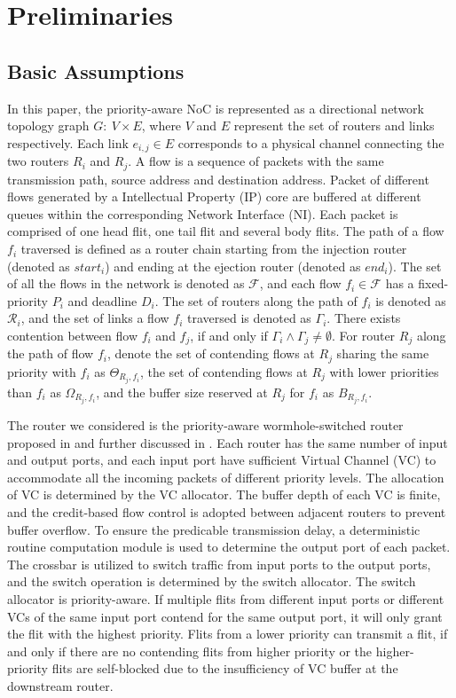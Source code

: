 \documentclass[preprint]{elsarticle}
\begin{document}
\section{Preliminaries}\label{model}
\subsection{Basic Assumptions}
In this paper, the priority-aware NoC is represented as a directional network topology graph $G:\ V\times E$, where $V$ and $E$ represent the set of routers and links respectively. Each link $e_{i,j}\in E$ corresponds to a physical channel connecting the two routers $R_i$ and $R_j$. A flow is a sequence of packets with the same transmission path, source address and destination address. Packet of different flows generated by a Intellectual Property (IP) core are buffered at different queues within the corresponding Network Interface (NI). Each packet is comprised of one head flit, one tail flit and several body flits. The path of a flow $f_i$ traversed is defined as a router chain starting from the injection router (denoted as $start_i$) and ending at the ejection router (denoted as $end_i$). The set of all the flows in the network is denoted as $\mathcal{F}$, and each flow $f_i\in\mathcal{F}$ has a fixed-priority $P_i$ and deadline $D_i$. The set of routers along the path of $f_i$ is denoted as $\mathcal{R}_i$, and the set of links a flow $f_i$ traversed is denoted as $\Gamma_i$. There exists contention between flow $f_i$ and $f_j$, if and only if $\Gamma_i\wedge\Gamma_j\neq\emptyset$. For router $R_j$ along the path of flow $f_i$, denote the set of contending flows at $R_j$ sharing the same priority with $f_i$ as $\Theta_{R_j,f_i}$, the set of contending flows at $R_j$ with lower priorities than $f_i$ as $\Omega_{R_j,f_i}$, and the buffer size reserved at $R_j$ for $f_i$ as $B_{R_j,f_i}$.

The router we considered is the priority-aware wormhole-switched router proposed in \cite{Shi:2008:RCA:1397757.1397996} and further discussed in \cite{627905}\cite{707545}\cite{73}. Each router has the same number of input and output ports, and each input port have sufficient Virtual Channel (VC) to accommodate all the incoming packets of different priority levels. The allocation of VC is determined by the VC allocator. The buffer depth of each VC is finite, and the credit-based flow control \cite{DaTo04} is adopted between adjacent routers to prevent buffer overflow. To ensure the predicable transmission delay, a deterministic routine computation module is used to determine the output port of each packet. The crossbar is utilized to switch traffic from input ports to the output ports, and the switch operation is determined by the switch allocator. The switch allocator is priority-aware. If multiple flits from different input ports or different VCs of the same input port contend for the same output port, it will only grant the flit with the highest priority. Flits from a lower priority can transmit a flit, if and only if there are no contending flits from higher priority or the higher-priority flits are self-blocked due to the insufficiency of VC buffer at the downstream router.
\end{document}
